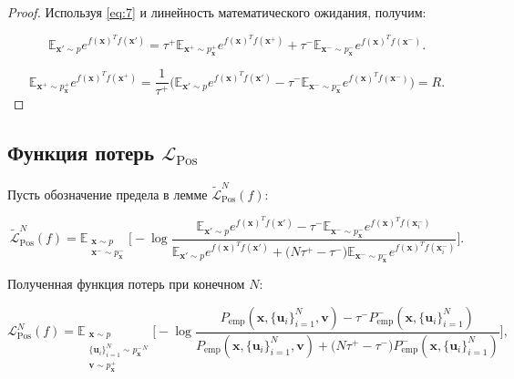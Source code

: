 \documentclass[a4paper, 14pt]{article}
\begin{document}
\begin{proof}
Используя \ref{eq:7} и линейность математического ожидания, получим:

\[\mathbb{E}_{\textbf{x}' \sim p} e^{f(\textbf{x})^T f(\textbf{x}')} = \tau^+\mathbb{E}_{\textbf{x}^+ \sim p_\mathbf{x}^+} e^{f(\textbf{x})^T f(\textbf{x}^+)} + \tau^- \mathbb{E}_{\textbf{x}^- \sim p_\mathbf{x}^-} e^{f(\textbf{x})^T f(\textbf{x}^-)}.\]

\[\mathbb{E}_{\textbf{x}^+ \sim p_\mathbf{x}^+} e^{f(\textbf{x})^T f(\textbf{x}^+)} = \frac{1}{\tau^+} \big(\mathbb{E}_{\textbf{x}' \sim p} e^{f(\textbf{x})^T f(\textbf{x}')} - \tau^- \mathbb{E}_{\textbf{x}^- \sim p_\mathbf{x}^-} e^{f(\textbf{x})^T f(\textbf{x}^-)}\big) = R.\]
\end{proof}

\subsection{Функция потерь $\mathcal{L}_{\text{Pos}}$}

Пусть обозначение предела в лемме $\tilde{\mathcal{L}}_{\text{Pos}}^N (f)$:

\begin{equation} \label{eq:10}
\tilde{\mathcal{L}}_{\text{Pos}}^N (f) = \mathbb{E}_{\substack{\textbf{x} \sim p \\ \textbf{x}^- \sim p_\mathbf{x}^-}} \bigg[ - \log \frac{\mathbb{E}_{\textbf{x}' \sim p} e^{f(\textbf{x})^T f(\textbf{x}')} - \tau^- \mathbb{E}_{\textbf{x}^- \sim p_\mathbf{x}^-} e^{f(\textbf{x})^T f(\textbf{x}_i^-)}}{\mathbb{E}_{\textbf{x}' \sim p} e^{f(\textbf{x})^T f(\textbf{x}')} + \big(N \tau^+ - \tau^-\big) \mathbb{E}_{\textbf{x}^- \sim p_\mathbf{x}^-} e^{f(\textbf{x})^T f(\textbf{x}_i^-)}}\bigg].
\end{equation}

Полученная функция потерь при конечном $N$:

\begin{equation}\label{eq:11}
\mathcal{L}_{\text{Pos}}^N (f) = \mathbb{E}_{\substack{\textbf{x} \sim p \\ \{\textbf{u}_i\}_{i=1}^N \sim {p_\mathbf{x}^-}^N \\ \textbf{v} \sim p_\mathbf{x}^+}} \bigg[-\log \frac{P_{\text{emp}} (\textbf{x}, \{\textbf{u}_i\}_{i=1}^N, \textbf{v}) - \tau^- P_{\text{emp}}^- (\textbf{x}, \{\textbf{u}_i\}_{i=1}^N)} {P_{\text{emp}} (\textbf{x}, \{\textbf{u}_i\}_{i=1}^N, \textbf{v})+ \big(N \tau^+ - \tau^-\big) P_{\text{emp}}^- (\textbf{x}, \{\textbf{u}_i\}_{i=1}^N) }\bigg],
\end{equation}
\end{document}
